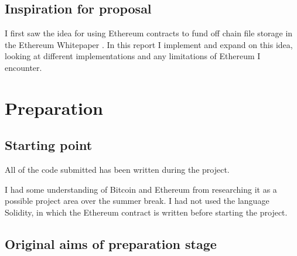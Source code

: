 \documentclass[12pt,a4paper,twoside,openright]{report}
\begin{document}
\section{Inspiration for proposal}

I first saw the idea for using Ethereum contracts to fund off chain file storage in the Ethereum Whitepaper \cite{eth-whitepaper}.
In this report I implement and expand on this idea, looking at different implementations and any limitations of Ethereum I encounter.





\chapter{Preparation}

\section{Starting point}

All of the code submitted has been written during the project.

I had some understanding of Bitcoin and Ethereum from researching it as a possible project area over the summer break.
I had not used the language Solidity, in which the Ethereum contract is written before starting the project.

\section{Original aims of preparation stage}
\end{document}
